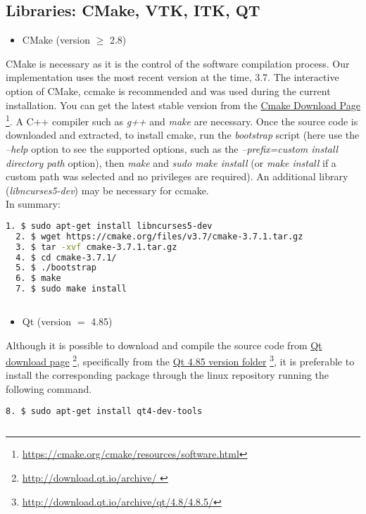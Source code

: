 \documentclass[12pt]{article}
\begin{document}
\subsection{Libraries: CMake, VTK, ITK, QT}

\begin{itemize}
\item CMake (version $\geq$ 2.8)
\end{itemize}
\begin{par}
CMake is necessary as it is the control of the software compilation process. Our implementation uses
the most recent version at the time, 3.7. The interactive option of CMake, ccmake is recommended and
was used during the current installation. You can get the latest stable version from the
\href{https://cmake.org/cmake/resources/software.html}{\color{blue} Cmake Download Page}
\footnote{\url{https://cmake.org/cmake/resources/software.html}}. A C++ compiler such as \textit{g++}
and \textit{make} are necessary. Once the source code is downloaded and extracted, to install cmake,
run the \textit{bootstrap} script (here use the \textit{--help} option to see the supported options,
such as the \textit{--prefix=custom install directory path} option), then \textit{make} and
\textit{sudo make install} (or \textit{make install} if a custom path was selected and no privileges
are required). An additional library (\textit{libncurses5-dev}) may be necessary for ccmake. \\

In summary:\\

\noindent
\small
\begin{lstlisting}[language=bash]
  1. $ sudo apt-get install libncurses5-dev
  2. $ wget https://cmake.org/files/v3.7/cmake-3.7.1.tar.gz
  3. $ tar -xvf cmake-3.7.1.tar.gz
  4. $ cd cmake-3.7.1/
  5. $ ./bootstrap
  6. $ make
  7. $ sudo make install
  
\end{lstlisting}

\end{par}

\normalsize

\begin{itemize}
\item Qt (version $=$ 4.85)
\end{itemize}
\begin{par}
Although it is possible to download and compile the source code from
\href{http://download.qt.io/archive/ }{\color{blue} Qt download page}
\footnote{\url{http://download.qt.io/archive/ }}, specifically from the \href{http://download.qt.io/archive/qt/4.8/4.8.5/}{\color{blue} Qt 4.85 version folder}
\footnote{\url{http://download.qt.io/archive/qt/4.8/4.8.5/}}, it is preferable to install the
corresponding package through the linux repository running the following command.\\
\noindent
\small
\begin{lstlisting}[language=bash]
  8. $ sudo apt-get install qt4-dev-tools
  
\end{lstlisting}
\end{par}
\normalsize
\end{document}
